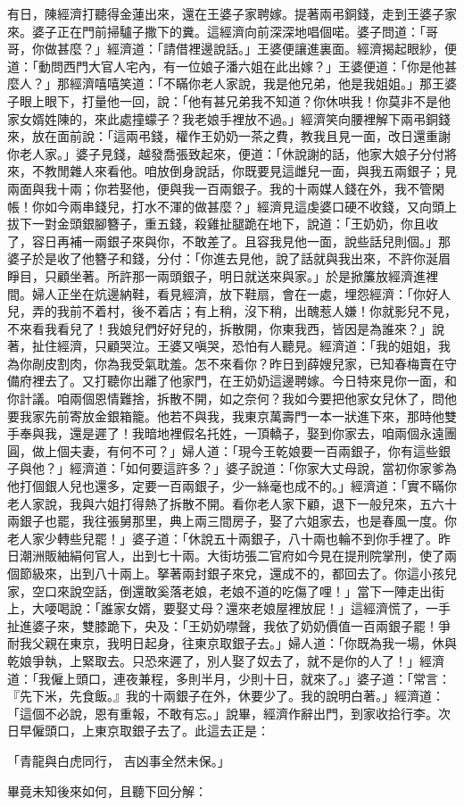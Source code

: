 有日，陳經濟打聽得金蓮出來，還在王婆子家聘嫁。提著兩弔銅錢，走到王婆子家來。婆子正在門前掃驢子撒下的糞。這經濟向前深深地唱個喏。婆子問道：「哥哥，你做甚麼？」經濟道：「請借裡邊說話。」王婆便讓進裏面。經濟揭起眼紗，便道：「動問西門大官人宅內，有一位娘子潘六姐在此出嫁？」王婆便道：「你是他甚麼人？」那經濟嘻嘻笑道：「不瞞你老人家說，我是他兄弟，他是我姐姐。」那王婆子眼上眼下，打量他一回，說：「他有甚兄弟我不知道？你休哄我！你莫非不是他家女婿姓陳的，來此處撞蠓子？我老娘手裡放不過。」經濟笑向腰裡解下兩弔銅錢來，放在面前說：「這兩弔錢，權作王奶奶一茶之費，教我且見一面，改日還重謝你老人家。」婆子見錢，越發喬張致起來，便道：「休說謝的話，他家大娘子分付將來，不教閒雜人來看他。咱放倒身說話，你既要見這雌兒一面，與我五兩銀子；見兩面與我十兩；你若娶他，便與我一百兩銀子。我的十兩媒人錢在外，我不管閑帳！你如今兩串錢兒，打水不渾的做甚麼？」經濟見這虔婆口硬不收錢，又向頭上拔下一對金頭銀腳簪子，重五錢，殺雞扯腿跪在地下，說道：「王奶奶，你且收了，容日再補一兩銀子來與你，不敢差了。且容我見他一面，說些話兒則個。」那婆子於是收了他簪子和錢，分付：「你進去見他，說了話就與我出來，不許你涎眉睜目，只顧坐著。所許那一兩頭銀子，明日就送來與家。」於是掀簾放經濟進裡間。婦人正坐在炕邊納鞋，看見經濟，放下鞋扇，會在一處，埋怨經濟：「你好人兒，弄的我前不着村，後不着店；有上稍，沒下稍，出醜惹人嫌！你就影兒不見，不來看我看兒了！我娘兒們好好兒的，拆散開，你東我西，皆因是為誰來？」說著，扯住經濟，只顧哭泣。王婆又嗔哭，恐怕有人聽見。經濟道：「我的姐姐，我為你剮皮割肉，你為我受氣耽羞。怎不來看你？昨日到薛嫂兒家，已知春梅賣在守備府裡去了。又打聽你出離了他家門，在王奶奶這邊聘嫁。今日特來見你一面，和你計議。咱兩個恩情難捨，拆散不開，如之奈何？我如今要把他家女兒休了，問他要我家先前寄放金銀箱籠。他若不與我，我東京萬壽門一本一狀進下來，那時他雙手奉與我，還是遲了！我暗地裡假名托姓，一頂轎子，娶到你家去，咱兩個永遠團圓，做上個夫妻，有何不可？」婦人道：「現今王乾娘要一百兩銀子，你有這些銀子與他？」經濟道：「如何要這許多？」婆子說道：「你家大丈母說，當初你家爹為他打個銀人兒也還多，定要一百兩銀子，少一絲毫也成不的。」經濟道：「實不瞞你老人家說，我與六姐打得熱了拆散不開。看你老人家下顧，退下一般兒來，五六十兩銀子也罷，我往張舅那里，典上兩三間房子，娶了六姐家去，也是春風一度。你老人家少轉些兒罷！」婆子道：「休說五十兩銀子，八十兩也輪不到你手裡了。昨日潮洲販紬絹何官人，出到七十兩。大街坊張二官府如今見在提刑院掌刑，使了兩個節級來，出到八十兩上。拏著兩封銀子來兌，還成不的，都回去了。你這小孩兒家，空口來說空話，倒還敢奚落老娘，老娘不道的吃傷了哩！」當下一陣走出街上，大喓喝說：「誰家女婿，要娶丈母？還來老娘屋裡放屁！」這經濟慌了，一手扯進婆子來，雙膝跪下，央及：「王奶奶噤聲，我依了奶奶價值一百兩銀子罷！爭耐我父親在東京，我明日起身，往東京取銀子去。」婦人道：「你既為我一場，休與乾娘爭執，上緊取去。只恐來遲了，別人娶了奴去了，就不是你的人了！」經濟道：「我僱上頭口，連夜兼程，多則半月，少則十日，就來了。」婆子道：「常言：『先下米，先食飯。』我的十兩銀子在外，休要少了。我的說明白著。」經濟道：「這個不必說，恩有重報，不敢有忘。」說畢，經濟作辭出門，到家收拾行李。次日早僱頭口，上東京取銀子去了。此這去正是：

「青龍與白虎同行，  吉凶事全然未保。」

畢竟未知後來如何，且聽下回分解：

